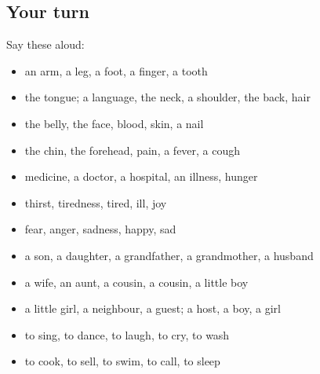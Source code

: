 \subsection*{Your turn}
Say these aloud:

\begin{itemize}
\raggedright
  \item an arm, a leg, a foot, a finger, a tooth
  \item the tongue; a language, the neck, a shoulder, the back, hair
  \item the belly, the face, blood, skin, a nail
  \item the chin, the forehead, pain, a fever, a cough
  \item medicine, a doctor, a hospital, an illness, hunger
  \item thirst, tiredness, tired, ill, joy
  \item fear, anger, sadness, happy, sad
  \item a son, a daughter, a grandfather, a grandmother, a husband
  \item a wife, an aunt, a cousin, a cousin, a little boy
  \item a little girl, a neighbour, a guest; a host, a boy, a girl
  \item to sing, to dance, to laugh, to cry, to wash
  \item to cook, to sell, to swim, to call, to sleep
\end{itemize}

